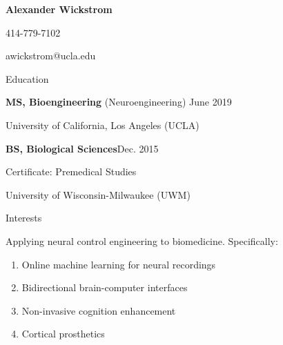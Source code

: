 \documentclass[10pt, oneside]{article}
\begin{document}
	


\centerline{\Large  \textbf{Alexander Wickstrom}}
        \vspace{1mm}
	\centerline{414-779-7102}
  	 \centerline{awickstrom@ucla.edu} 

\begin{cvlist}{Education}
    \item \textbf{MS, Bioengineering} (Neuroengineering) \hfill{June 2019}
    
    \item {University of California, Los Angeles} (UCLA)
	\item \textbf{BS, Biological Sciences}\hfill  Dec. 2015
	\item \quad Certificate: Premedical Studies
	\item {University of Wisconsin-Milwaukee} (UWM)
\end{cvlist}
\vspace{-10mm}
%
%
%
%
%
%
%
%
\begin{cvlist}{Interests}
     \item Applying neural control engineering to biomedicine. Specifically: 
     \begin{enumerate}
        \item Online machine learning for neural recordings
        \item Bidirectional brain-computer interfaces
        \item Non-invasive cognition enhancement
          \item Cortical prosthetics
     \end{enumerate}
\end{cvlist}
\vspace{-10mm}
\end{document}
